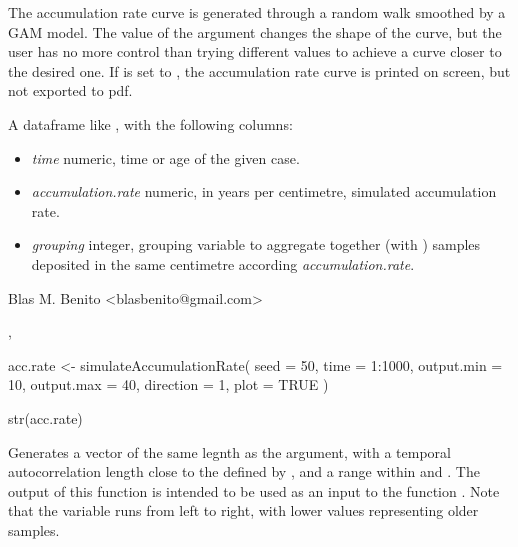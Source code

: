 \documentclass[letterpaper]{book}
\begin{document}
%
\begin{Details}\relax
The accumulation rate curve is generated through a random walk smoothed by a GAM model. The value of the  argument changes the shape of the curve, but the user has no more control than trying different values to achieve a curve closer to the desired one. If  is set to , the accumulation rate curve is printed on screen, but not exported to pdf.
\end{Details}
%
\begin{Value}
A dataframe like , with the following columns:
\begin{itemize}

\item \emph{time} numeric, time or age of the given case.
\item \emph{accumulation.rate} numeric, in years per centimetre, simulated accumulation rate.
\item \emph{grouping} integer, grouping variable to aggregate together (with ) samples deposited in the same centimetre according \emph{accumulation.rate}.

\end{itemize}

\end{Value}
%
\begin{Author}\relax
Blas M. Benito  <blasbenito@gmail.com>
\end{Author}
%
\begin{SeeAlso}\relax
{}, 
\end{SeeAlso}
%
\begin{Examples}
\begin{ExampleCode}

acc.rate <- simulateAccumulationRate(
 seed = 50,
 time = 1:1000,
 output.min = 10,
 output.max = 40,
 direction = 1,
 plot = TRUE
 )

str(acc.rate)

\end{ExampleCode}
\end{Examples}
%
\begin{Description}\relax
Generates a vector of the same legnth as the  argument, with a temporal autocorrelation length close to the defined by , and a range within  and . The output of this function is intended to be used as an input to the function . Note that the variable  runs from left to right, with lower values representing older samples.
\end{Description}
\end{document}
